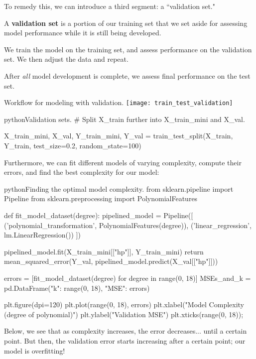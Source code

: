 \documentclass[openany]{book}
\begin{document}
To remedy this, we can introduce a third segment: a ``validation set."

\begin{defn}
	A \textbf{validation set} is a portion of our training set that we set aside for assessing model performance while it is still being developed.
	
	We train the model on the training set, and assess performance on the validation set. We then adjust the data and repeat.
	
	After \textit{all} model development is complete, we assess final performance on the test set.
\end{defn}

\begin{figurebox}[]{Workflow for modeling with validation.}
	\centering\texttt{[image: train\_test\_validation]}
\end{figurebox}

\begin{code}{python}{Validation sets.}
# Split X_train further into X_train_mini and X_val.

X_train_mini, X_val, Y_train_mini, Y_val = train_test_split(X_train, Y_train, test_size=0.2, random_state=100)
\end{code}

Furthermore, we can fit different models of varying complexity, compute their errors, and find the best complexity for our model:
\begin{code}{python}{Finding the optimal model complexity.}
from sklearn.pipeline import Pipeline
from sklearn.preprocessing import PolynomialFeatures

def fit_model_dataset(degree):
pipelined_model = Pipeline([
('polynomial_transformation', PolynomialFeatures(degree)),
('linear_regression', lm.LinearRegression())    
])

pipelined_model.fit(X_train_mini[["hp"]], Y_train_mini)
return mean_squared_error(Y_val, pipelined_model.predict(X_val[["hp"]]))

errors = [fit_model_dataset(degree) for degree in range(0, 18)]
MSEs_and_k = pd.DataFrame({"k": range(0, 18), "MSE": errors})

plt.figure(dpi=120)
plt.plot(range(0, 18), errors)
plt.xlabel("Model Complexity (degree of polynomial)")
plt.ylabel("Validation MSE")
plt.xticks(range(0, 18));
\end{code}

Below, we see that as complexity increases, the error decreases... until a certain point. But then, the validation error starts increasing after a certain point; our model is overfitting!
\end{document}
